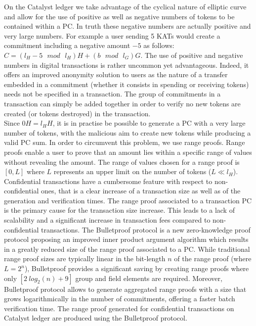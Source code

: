 On the Catalyst ledger we take advantage of the cyclical nature of elliptic curve and allow for the use of positive as well as negative numbers of tokens to be contained within a PC. In truth these negative numbers are actually positive and very large numbers. For example a user sending 5 KATs would create a commitment including a negative amount $-5$ as follows: $C = (l_H - 5 \text{ $mod$ } l_H) H + (b \text{ $mod$ } l_G) G$. The use of positive and negative numbers in digital transactions is rather uncommon yet advantageous. Indeed, it offers an improved anonymity solution to users as the nature of a transfer embedded in a commitment (whether it consists in spending or receiving tokens) needs not be specified in a transaction. The group of commitments in a transaction can simply be added together in order to verify no new tokens are created (or tokens destroyed) in the transaction. \\

Since $0H=l_HH$, it is in practise be possible to generate a PC with a very large number of tokens, with the malicious aim to create new tokens while producing a valid PC sum. In order to circumvent this problem, we use range proofs. Range proofs enable a user to prove that an amount lies within a specific range of values without revealing the amount. The range of values chosen for a range proof is $[0,L]$ where $L$ represents an upper limit on the number of tokens ($L \ll l_H$).\\

Confidential transactions have a cumbersome feature with respect to non-confidential ones, that is a clear increase of a transaction size as well as of the generation and verification times. The range proof associated to a transaction PC is the primary cause for the transaction size increase. This leads to a lack of scalability and a significant increase in transaction fees compared to non-confidential transactions. The Bulletproof protocol is a new zero-knowledge proof protocol \cite{bulletproof} proposing an improved inner product argument algorithm which results in a greatly reduced size of the range proof associated to a PC. While traditional range proof sizes are typically linear in the bit-length $n$ of the range proof (where $L = 2^n$), Bulletproof provides a significant saving by creating range proofs where only $[2~log_2(n) + 9]$ group and field elements are required. Moreover, Bulletproof protocol allows to generate aggregated range proofs with a size that grows logarithmically in the number of commitments, offering a faster batch verification time. The range proof generated for confidential transactions on Catalyst ledger are produced using the Bulletproof protocol. 
